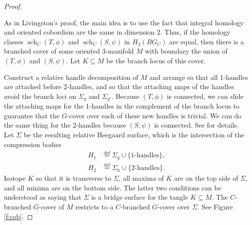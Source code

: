 \documentclass[10pt,twocolumn,amsmath,amssymb,aps,pra,secnumarabic,
    nofootinbib,groupedaddress]{revtex4-1}
\newcommand{\defeq}{\stackrel{\mathrm{def}}=}
\newcommand{\sch}{\operatorname{sch}}
\begin{document}
\begin{proof}
\begin{figure*}
\begin{tikzpicture}[decoration={markings,
    mark=at position 0.5 with {\arrow{angle 90}}}]
\end{tikzpicture}
\caption{A cobordism $M$ between the branched cover $(T,\phi)$ of $\Sigma_g$ and the branched cover $(S,\psi)$ of $\Sigma_{g'}$ provides a mutual stabilization of the two covers.  The branch locus $K \subseteq M$ is drawn in green.  The dashed green arcs denote $K_1$, which is the part of $K$ between $\Sigma_g$ and the relative Heegaard splitting $\Sigma$.  The solid green arcs denote $K_2$, which is the part of $K$ between $\Sigma$ and $\Sigma_{g'}$.  The labels $a,b,c,d,e$ denote elements in $C$.   To avoid overcrowding this schematic, we have not drawn a Heegaard diagram on $\Sigma$.}
\label{f:cob}
\end{figure*}

As in Livingston's proof, the main idea is to use the fact that integral homology and oriented cobordism are the same in dimension 2.  Thus, if the homology classes $\sch_C(T,\phi)$ and $\sch_C(S,\psi)$ in $H_2(BG_C)$ are equal, then there is a branched cover of some oriented 3-manifold $M$ with boundary the union of $(T,\phi)$ and $(S,\psi)$.  Let $K \subseteq M$ be the branch locus of this cover.

Construct a relative handle decomposition of $M$ and arrange so that all 1-handles are attached before 2-handles, and so that the attaching maps of the handles avoid the branch loci on $\Sigma_g$ and $\Sigma_{g'}$.  Because $(T,\phi)$ is connected, we can slide the attaching maps for the 1-handles in the complement of the branch locus to guarantee that the $G$-cover over each of these new handles is trivial.  We can do the same thing for the 2-handles because $(S,\psi)$ is connected.  See \cite{Livingston:stabilizing} for details.  Let $\Sigma$ be the resulting relative Heegaard surface, which is the intersection of the compression bodies
\[\begin{aligned}
H_1 &\defeq \Sigma_g \cup \{\text{1-handles}\}, \\
H_2 &\defeq \Sigma_h \cup \{\text{2-handles}\}.
\end{aligned}\]
Isotope $K$ so that it is transverse to $\Sigma$, all maxima of $K$ are on the top side of $\Sigma$, and all minima are on the bottom side.  The latter two conditions can be understood as saying that $\Sigma$ is a bridge surface for the tangle $K \subseteq M$.  The $C$-branched $G$-cover of $M$ restricts to a $C$-branched $G$-cover over $\Sigma$.  See Figure \ref{f:cob}.


\end{proof}
\end{document}
